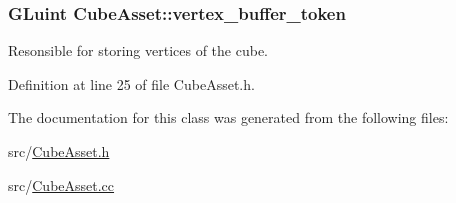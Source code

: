 \hypertarget{class_cube_asset_a31bd098f60e2c24988316a9cc9335987}{}
\subsubsection[{vertex\+\_\+buffer\+\_\+token}]{\setlength{\rightskip}{0pt plus 5cm}G\+Luint Cube\+Asset\+::vertex\+\_\+buffer\+\_\+token\hspace{0.3cm}{\ttfamily [private]}}\label{class_cube_asset_a31bd098f60e2c24988316a9cc9335987}
Resonsible for storing vertices of the cube. 

Definition at line 25 of file Cube\+Asset.\+h.



The documentation for this class was generated from the following files\+:\begin{DoxyCompactItemize}
\item 
src/\hyperlink{_cube_asset_8h}{Cube\+Asset.\+h}\item 
src/\hyperlink{_cube_asset_8cc}{Cube\+Asset.\+cc}\end{DoxyCompactItemize}
